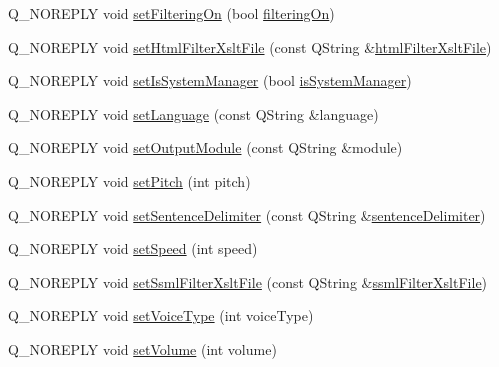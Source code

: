 \begin{DoxyCompactItemize}
\item 
Q\+\_\+\+N\+O\+R\+E\+P\+L\+Y void \hyperlink{classOrgKdeKSpeechInterface_a0d5891c0acf045801bdd95b76ebb322c}{set\+Filtering\+On} (bool \hyperlink{classOrgKdeKSpeechInterface_afd3f3b84235b84fe7ab787c9fa1e571e}{filtering\+On})
\item 
Q\+\_\+\+N\+O\+R\+E\+P\+L\+Y void \hyperlink{classOrgKdeKSpeechInterface_a5ecf9d916e786a8fef28b6e0defdcb15}{set\+Html\+Filter\+Xslt\+File} (const Q\+String \&\hyperlink{classOrgKdeKSpeechInterface_acfd3d63167173567dfa892cc2366d346}{html\+Filter\+Xslt\+File})
\item 
Q\+\_\+\+N\+O\+R\+E\+P\+L\+Y void \hyperlink{classOrgKdeKSpeechInterface_a738d417f4a96873f33dfccbcb11f88f2}{set\+Is\+System\+Manager} (bool \hyperlink{classOrgKdeKSpeechInterface_a15613f721aa3e1fe1912b856fb700cd6}{is\+System\+Manager})
\item 
Q\+\_\+\+N\+O\+R\+E\+P\+L\+Y void \hyperlink{classOrgKdeKSpeechInterface_a89f4d0b4b47a105ac0ef1ea7bd2ad5de}{set\+Language} (const Q\+String \&language)
\item 
Q\+\_\+\+N\+O\+R\+E\+P\+L\+Y void \hyperlink{classOrgKdeKSpeechInterface_a24cfa82b753bac25040cbeac397cdc26}{set\+Output\+Module} (const Q\+String \&module)
\item 
Q\+\_\+\+N\+O\+R\+E\+P\+L\+Y void \hyperlink{classOrgKdeKSpeechInterface_ac390a6bdfd715ad206af0a15b9b9ef4c}{set\+Pitch} (int pitch)
\item 
Q\+\_\+\+N\+O\+R\+E\+P\+L\+Y void \hyperlink{classOrgKdeKSpeechInterface_acc314081c6ad390567dc3b0c8bcbee42}{set\+Sentence\+Delimiter} (const Q\+String \&\hyperlink{classOrgKdeKSpeechInterface_a76c92f0804ef9142efbc30dc9c292714}{sentence\+Delimiter})
\item 
Q\+\_\+\+N\+O\+R\+E\+P\+L\+Y void \hyperlink{classOrgKdeKSpeechInterface_aba6e77c25d01f18f6085e103a8872e84}{set\+Speed} (int speed)
\item 
Q\+\_\+\+N\+O\+R\+E\+P\+L\+Y void \hyperlink{classOrgKdeKSpeechInterface_a74fe528de573b5b2e4b5febc8709b9c6}{set\+Ssml\+Filter\+Xslt\+File} (const Q\+String \&\hyperlink{classOrgKdeKSpeechInterface_ab1571d8f688864b0e7f7ecc8929d7010}{ssml\+Filter\+Xslt\+File})
\item 
Q\+\_\+\+N\+O\+R\+E\+P\+L\+Y void \hyperlink{classOrgKdeKSpeechInterface_a2dc4feb571794f8c9d8efa887cc235f8}{set\+Voice\+Type} (int voice\+Type)
\item 
Q\+\_\+\+N\+O\+R\+E\+P\+L\+Y void \hyperlink{classOrgKdeKSpeechInterface_a1546617be4706449ff92082247388c9e}{set\+Volume} (int volume)
\item 

\end{DoxyCompactItemize}
